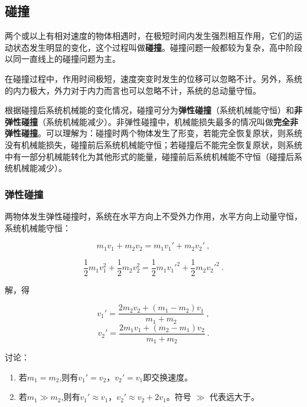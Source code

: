 \subsection{碰撞}

两个或以上有相对速度的物体相遇时，在极短时间内发生强烈相互作用，它们的运动状态发生明显的变化，这个过程叫做\textbf{碰撞}。碰撞问题一般都较为复杂，高中阶段以同一直线上的碰撞问题为主。

在碰撞过程中，作用时间极短，速度突变时发生的位移可以忽略不计。另外，系统的内力极大，外力对于内力而言也可以忽略不计，系统的总动量守恒。

根据碰撞后系统机械能的变化情况，碰撞可分为\textbf{弹性碰撞}（系统机械能守恒）和\textbf{非弹性碰撞}（系统机械能减少）。非弹性碰撞中，机械能损失最多的情况叫做\textbf{完全非弹性碰撞}。可以理解为：碰撞时两个物体发生了形变，若能完全恢复原状，则系统没有机械能损失，碰撞前后系统机械能守恒；若碰撞后不能完全恢复原状，则系统中有一部分机械能转化为其他形式的能量，碰撞前后系统机械能不守恒（碰撞后系统机械能减少）。

\subsubsection{弹性碰撞}

两物体发生弹性碰撞时，系统在水平方向上不受外力作用，水平方向上动量守恒，系统机械能守恒：

\begin{equation}
m_1v_1+m_2v_2=m_1v_1'+m_2v_2'~,
\end{equation}

\begin{equation}
\frac12m_1v_1^2+\frac12m_2v_2^2=\frac12m_1v_1'^2+\frac12m_2v_2'^2~.
\end{equation}

解，得

\begin{equation}
v_1'= \frac{2m_2v_2 + (m_1 - m_2)v_1}{m_1+m_2}~,
\end{equation}
\begin{equation}
v_2'= \frac{2m_1v_1 + (m_2 - m_1)v_2}{m_1+m_2}~.
\end{equation}

讨论：
\begin{enumerate}
\item 若$m_1=m_2$,则有$v_1'=v_2$，$v_2'=v_1$即交换速度。
\item 若$m_1\gg m_2$,则有$v_1'\approx v_1$，$v_2'\approx v_2+2v_1$。符号 $\gg$ 代表远大于。
\end{enumerate}


